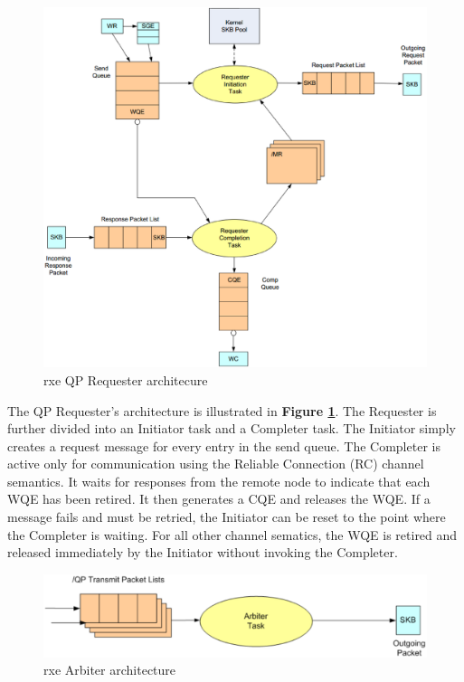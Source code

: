 \documentclass[11pt]{book}
\begin{document}
\begin{figure}[h]
\includegraphics[width=\textwidth]{rxe_req}
\caption{rxe QP Requester architecure \protect\cite{pearson-10}}
\label{rxe-req}
\end{figure}

The QP Requester's architecture is illustrated in \textbf{Figure
  \ref{rxe-req}}. The Requester is further divided into an Initiator task and a
Completer task. The Initiator simply creates a request message for every entry
in the send queue. The Completer is active only for communication using the
Reliable Connection (RC) channel semantics. It waits for responses from the
remote node to indicate that each WQE has been retired\cite {pearson-10}. It
then generates a CQE and releases the WQE. If a message fails and must be
retried, the Initiator can be reset to the point where the Completer is
waiting. For all other channel sematics, the WQE is retired and released
immediately by the Initiator without invoking the Completer.

\begin{figure}[h]
\includegraphics[width=\textwidth]{rxe_arbiter}
\caption{rxe Arbiter architecture \protect\cite{pearson-10}}
\label{rxe-arbiter}
\end{figure}
\end{document}
